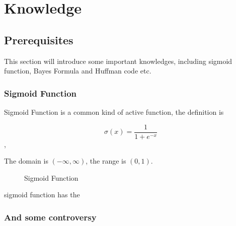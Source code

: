 \chapter{Knowledge}
\label{cha:knowledgei}

\section{Prerequisites}

This section will introduce some important knowledges, including sigmoid function, Bayes Formula and Huffman code etc.

\subsection{Sigmoid Function}

Sigmoid Function is a common kind of active function, the definition is

$$ \sigma(x) = \frac{1}{1+e^{-x}} $$,

The domain is $(-\infty, \infty)$, the range is $(0,1)$.

\begin{figure}[H]
\centering
\begin{minipage}{.4\textwidth}
  \centering
	\caption{Sigmoid Function}
	\label{fig:sigmoid}
\end{minipage}
\end{figure}

sigmoid function has the \textbf{}

\subsection{And some controversy}



